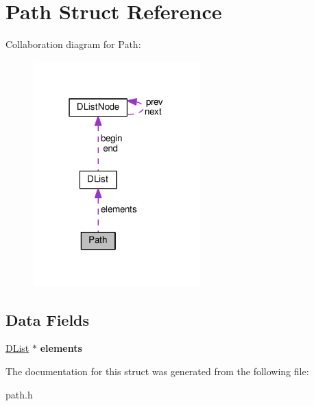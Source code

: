\hypertarget{structPath}{}\section{Path Struct Reference}
\label{structPath}


Collaboration diagram for Path\+:\nopagebreak
\begin{figure}[H]
\begin{center}
\leavevmode
\includegraphics[width=183pt]{structPath__coll__graph}
\end{center}
\end{figure}
\subsection*{Data Fields}
\begin{DoxyCompactItemize}
\item 
\hyperlink{structDList}{D\+List} $\ast$ {\bfseries elements}\hypertarget{structPath_a9767e852a01fe98f15198cc23538aad0}{}\label{structPath_a9767e852a01fe98f15198cc23538aad0}

\end{DoxyCompactItemize}


The documentation for this struct was generated from the following file\+:\begin{DoxyCompactItemize}
\item 
path.\+h\end{DoxyCompactItemize}
